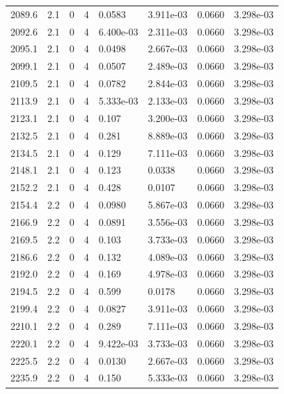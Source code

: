 \documentclass[preview]{standalone}
\begin{document}
{{{{{{{{{{{\begin{tabular}{L{1.2cm}C{1.2cm} C{0.3cm}C{0.5cm} C{1.4cm}C{1.4cm} C{1.4cm}C{1.4cm}}
  2089.6  &   2.1  & 0     &  4 &  0.0583  & 3.911e-03  & 0.0660 &  3.298e-03   \\ 
  2092.6  &   2.1  & 0     &  4 &  6.400e-03  & 2.311e-03  & 0.0660 &  3.298e-03   \\ 
  2095.1  &   2.1  & 0     &  4 &  0.0498  & 2.667e-03  & 0.0660 &  3.298e-03   \\ 
  2099.1  &   2.1  & 0     &  4 &  0.0507  & 2.489e-03  & 0.0660 &  3.298e-03   \\ 
  2109.5  &   2.1  & 0     &  4 &  0.0782  & 2.844e-03  & 0.0660 &  3.298e-03   \\ 
  2113.9  &   2.1  & 0     &  4 &  5.333e-03  & 2.133e-03  & 0.0660 &  3.298e-03   \\ 
  2123.1  &   2.1  & 0     &  4 &  0.107  & 3.200e-03  & 0.0660 &  3.298e-03   \\ 
  2132.5  &   2.1  & 0     &  4 &  0.281  & 8.889e-03  & 0.0660 &  3.298e-03   \\ 
  2134.5  &   2.1  & 0     &  4 &  0.129  & 7.111e-03  & 0.0660 &  3.298e-03   \\ 
  2148.1  &   2.1  & 0     &  4 &  0.123  & 0.0338  & 0.0660 &  3.298e-03   \\ 
  2152.2  &   2.1  & 0     &  4 &  0.428  & 0.0107  & 0.0660 &  3.298e-03   \\ 
  2154.4  &   2.2  & 0     &  4 &  0.0980  & 5.867e-03  & 0.0660 &  3.298e-03   \\ 
  2166.9  &   2.2  & 0     &  4 &  0.0891  & 3.556e-03  & 0.0660 &  3.298e-03   \\ 
  2169.5  &   2.2  & 0     &  4 &  0.103  & 3.733e-03  & 0.0660 &  3.298e-03   \\ 
  2186.6  &   2.2  & 0     &  4 &  0.132  & 4.089e-03  & 0.0660 &  3.298e-03   \\ 
  2192.0  &   2.2  & 0     &  4 &  0.169  & 4.978e-03  & 0.0660 &  3.298e-03   \\ 
  2194.5  &   2.2  & 0     &  4 &  0.599  & 0.0178  & 0.0660 &  3.298e-03   \\ 
  2199.4  &   2.2  & 0     &  4 &  0.0827  & 3.911e-03  & 0.0660 &  3.298e-03   \\ 
  2210.1  &   2.2  & 0     &  4 &  0.289  & 7.111e-03  & 0.0660 &  3.298e-03   \\ 
  2220.1  &   2.2  & 0     &  4 &  9.422e-03  & 3.733e-03  & 0.0660 &  3.298e-03   \\ 
  2225.5  &   2.2  & 0     &  4 &  0.0130  & 2.667e-03  & 0.0660 &  3.298e-03   \\ 
  2235.9  &   2.2  & 0     &  4 &  0.150  & 5.333e-03  & 0.0660 &  3.298e-03   \\ 

\end{tabular}}}}}}}}}}}}
\end{document}
